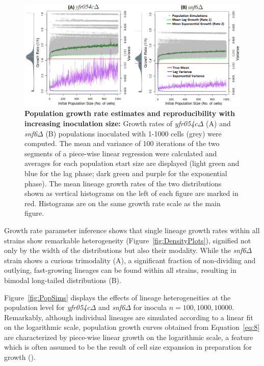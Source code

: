 \documentclass{bioinfo}
\begin{document}
\begin{figure}
  \centering
  \vspace{+1em}
  \includegraphics[width=1.3\linewidth]{Ch1MeanVar.png}  
\caption{\footnotesize{\textbf{Population growth rate estimates and reproducibility with increasing inoculation size:} Growth rates of \textit{yfr054c}$\Delta$ (A) and \textit{snf6}$\Delta$ (B) populations inoculated with 1-1000 cells (grey) were computed. The mean and variance of 100 iterations of the two segments of a piece-wise linear regression were calculated and averages for each population start size are displayed (light green and blue for the lag phase; dark green and purple for the exponential phase). The mean lineage growth rates of the two distributions shown as vertical histograms on the left of each figure are marked in red. Histograms are on the same growth rate scale as the main figure.}}
\label{fig:MeanVar}
\vspace{-2em}
\end{figure}

Growth rate parameter inference shows that single lineage growth rates within all strains show remarkable heterogeneity (Figure~\ref{fig:DensityPlots}), signified not only by the width of the distributions but also their modality. While the \textit{snf6$\Delta$} strain shows a curious trimodality (A), a significant fraction of non-dividing and outlying, fast-growing lineages can be found within all strains, resulting in bimodal long-tailed distributions (B). 

Figure~\ref{fig:PopSims} displays the effects of lineage heterogeneities at the population level for \textit{yfr054c}$\Delta$ and \textit{snf6}$\Delta$ for inocula $n=100, 1000, 10000$. Remarkably, although individual lineages are simulated according to a linear fit on the logarithmic scale, population growth curves obtained from Equation~\ref{eq:8} are characterized by piece-wise linear growth on the logarithmic scale, a feature which is often assumed to be the result of cell size expansion in preparation for growth (\citealp{Rolfe11}). 
\end{document}
